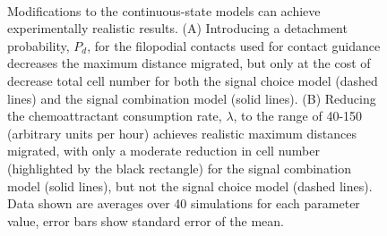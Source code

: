 \documentclass[review]{elsarticle}
\begin{document}
\begin{figure}
\centering
{}\
\caption{Modifications to the continuous-state models can achieve experimentally realistic results. (A) Introducing a detachment probability, $P_d$, for the filopodial contacts used for contact guidance decreases the maximum distance migrated, but only at the cost of decrease total cell number for both the signal choice model (dashed lines) and the signal combination model (solid lines). (B) Reducing the chemoattractant consumption rate, $\lambda$, to the range of 40-150 (arbitrary units per hour) achieves realistic maximum distances migrated, with only a moderate reduction in cell number (highlighted by the black rectangle) for the signal combination model (solid lines), but not the signal choice model (dashed lines). Data shown are averages over 40 simulations for each parameter value, error bars show standard error of the mean.\label{figFurtherModel}}
\end{figure}
\end{document}
